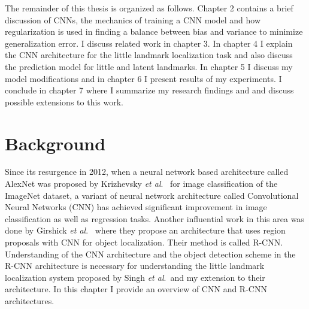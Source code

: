 \documentclass [11pt,letterpaper ,twoside ,openany ]{report}
\begin{document}
    The remainder of this thesis is organized as follows. Chapter 2 contains a brief discussion of CNNs, the mechanics of training a CNN model and how regularization is used in finding a balance between bias and variance to minimize generalization error. I discuss related work in chapter 3. In chapter 4 I explain the CNN architecture for the little landmark localization task and also discuss the prediction model for little and latent landmarks. In chapter 5 I discuss my model modifications and in chapter 6 I present results of my experiments. I conclude in chapter 7 where I summarize my research findings and and discuss possible extensions to this work.

    \chapter{Background}
    \doublespacing
    Since its resurgence in 2012, when a neural network based architecture called AlexNet was proposed by Krizhevsky \textit{et al}.\ \cite{krizhevsky2012imagenet} for image classification of the ImageNet \cite{russakovsky2015imagenet} dataset, a variant of neural network architecture called Convolutional Neural Networks (CNN) has achieved significant improvement in image classification as well as regression tasks. Another influential work in this area was done by Girshick \textit{et al}.\ \cite{girshick2014rich} where they propose an architecture that uses region proposals with CNN for object localization. Their method is called R-CNN. Understanding of the CNN architecture and the object detection scheme in the R-CNN architecture is necessary for understanding the little landmark localization system proposed by Singh \textit{et al}.\ and my extension to their architecture. In this chapter I provide an overview of CNN and R-CNN architectures. 
\end{document}
